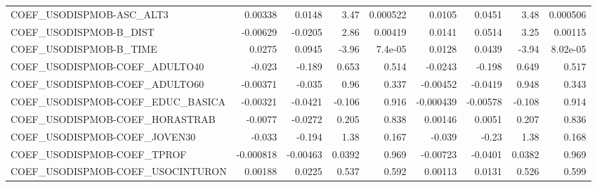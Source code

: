 \begin{tabular}{lrrrrrrrr}
COEF\_USODISPMOB-ASC\_ALT3          &     0.00338 &       0.0148 &     3.47 & 0.000522 &     0.0105 &      0.0451 &         3.48 &      0.000506 \\
COEF\_USODISPMOB-B\_DIST            &    -0.00629 &      -0.0205 &     2.86 &  0.00419 &     0.0141 &      0.0514 &         3.25 &       0.00115 \\
COEF\_USODISPMOB-B\_TIME            &      0.0275 &       0.0945 &    -3.96 &  7.4e-05 &     0.0128 &      0.0439 &        -3.94 &      8.02e-05 \\
COEF\_USODISPMOB-COEF\_ADULTO40     &      -0.023 &       -0.189 &    0.653 &    0.514 &    -0.0243 &      -0.198 &        0.649 &         0.517 \\
COEF\_USODISPMOB-COEF\_ADULTO60     &    -0.00371 &       -0.035 &     0.96 &    0.337 &   -0.00452 &     -0.0419 &        0.948 &         0.343 \\
COEF\_USODISPMOB-COEF\_EDUC\_BASICA  &    -0.00321 &      -0.0421 &   -0.106 &    0.916 &  -0.000439 &    -0.00578 &       -0.108 &         0.914 \\
COEF\_USODISPMOB-COEF\_HORASTRAB    &     -0.0077 &      -0.0272 &    0.205 &    0.838 &    0.00146 &      0.0051 &        0.207 &         0.836 \\
COEF\_USODISPMOB-COEF\_JOVEN30      &      -0.033 &       -0.194 &     1.38 &    0.167 &     -0.039 &       -0.23 &         1.38 &         0.168 \\
COEF\_USODISPMOB-COEF\_TPROF        &   -0.000818 &     -0.00463 &   0.0392 &    0.969 &   -0.00723 &     -0.0401 &       0.0382 &         0.969 \\
COEF\_USODISPMOB-COEF\_USOCINTURON  &     0.00188 &       0.0225 &    0.537 &    0.592 &    0.00113 &      0.0131 &        0.526 &         0.599 \\
\bottomrule
\end{tabular}
